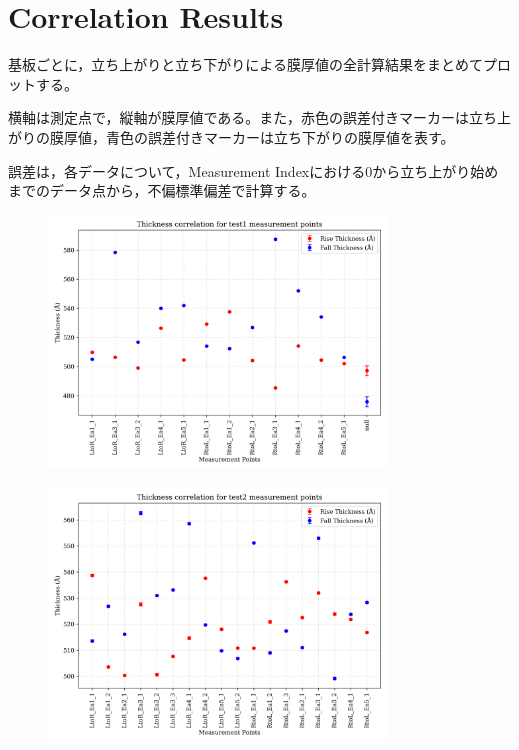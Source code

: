 \documentclass[platex,dvipdfmx,10pt,twoside,a4paper,jis2004]{jsarticle}
\begin{document}
\section*{Correlation Results}
基板ごとに，立ち上がりと立ち下がりによる膜厚値の全計算結果をまとめてプロットする。
\par
横軸は測定点で，縦軸が膜厚値である。また，赤色の誤差付きマーカーは立ち上がりの膜厚値，青色の誤差付きマーカーは立ち下がりの膜厚値を表す。
\par
誤差は，各データについて，Measurement Indexにおける0から立ち上がり始めまでのデータ点から，不偏標準偏差で計算する。
\begin{figure}[H]
    \centering
    \includegraphics[width=0.8\textwidth]{thickness_correlation_test1.png}
    \label{fig:Correlationtest1}
\end{figure}
\begin{figure}[H]
    \centering
    \includegraphics[width=0.8\textwidth]{thickness_correlation_test2.png}
    \label{fig:Correlationtest2}
\end{figure}
\end{document}
